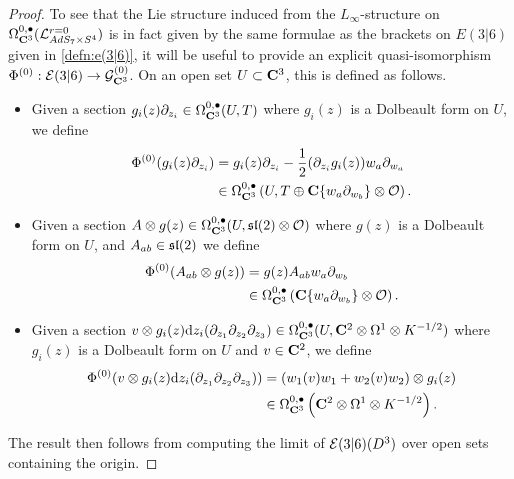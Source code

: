 \documentclass[../main.tex]{subfiles}
\begin{document}
\begin{proof}
To see that the Lie structure induced from the $L_\infty$-structure on $\Omega^{0,\bullet}_{\mathbf{C}^3} (\mathcal{L}^{r=0}_{AdS_7\times S^4} )$ is in fact given by the same formulae as the brackets on $E(3|6)$ given in \ref{defn:e(3|6)}, it will be useful to provide an explicit quasi-isomorphism $\Phi^{(0)} : \mathcal{E}(3|6) \to \mathcal{G}^{(0)}_{\mathbf{C}^3}$. On an open set $U\subset \mathbf{C}^3$, this is defined as follows.

\begin{itemize}
\item Given a section $g_i(z)\partial_{z_i}\in \Omega^{0,\bullet}_{\mathbf{C}^3} (U, T)$ where $g_i(z)$ is a Dolbeault form on $U$, we define
\begin{align*}
\Phi^{(0)} (g_i (z) \partial_{z_i} ) &= g_i (z) \partial_{z_i} - \frac 12(\partial_{z_i} g_i (z)) w_a \partial_{w_a} \\
&\in \Omega^{0,\bullet}_{\mathbf{C}^3} \left ( U, T \oplus \mathbf{C} \{w_a \partial_{w_b} \} \otimes \mathcal{O} \right ).  
\end{align*}

\item Given a section $A\otimes g(z)\in \Omega^{0,\bullet}_{\mathbf{C}^3} (U,\mathfrak{sl}(2) \otimes \mathcal{O})$ where $g(z)$ is a Dolbeault form on $U$, and $A_{ab}\in \mathfrak{sl}(2)$ we define
\begin{align*}
\Phi^{(0)} (A_{ab}\otimes g(z) ) &=  g(z) A_{ab}w_a\partial_{w_b}\\
&\in \Omega^{0,\bullet}_{\mathbf{C}^3} \left ( \mathbf{C} \{w_a \partial_{w_b} \} \otimes \mathcal{O} \right ).  
\end{align*}

\item Given a section $v\otimes g_i(z)\mathrm{d} z_i (\partial_{z_1}\partial_{z_2}\partial_{z_3} ) \in \Omega^{0,\bullet}_{\mathbf{C}^3} (U, \mathbf{C}^2\otimes \Omega^1\otimes K^{-1/2})$ where $g_i(z)$ is a Dolbeault form on $U$ and $v\in \mathbf{C}^2$, we define
\begin{align*}
\Phi^{(0)} (v\otimes g_i(z)\mathrm{d} z_i (\partial_{z_1}\partial_{z_2}\partial_{z_3} ) ) &= (w_1(v)w_1+w_2(v)w_2) \otimes g_i(z)  \\
&\in \Omega^{0,\bullet}_{\mathbf{C}^3} \left ( \mathbf{C}^2\otimes \Omega^1\otimes K^{-1/2}  \right ).  
\end{align*}
\end{itemize}

The result then follows from computing the limit of $\mathcal{E}(3|6) (D^3)$ over open sets containing the origin.
\end{proof}
\end{document}
